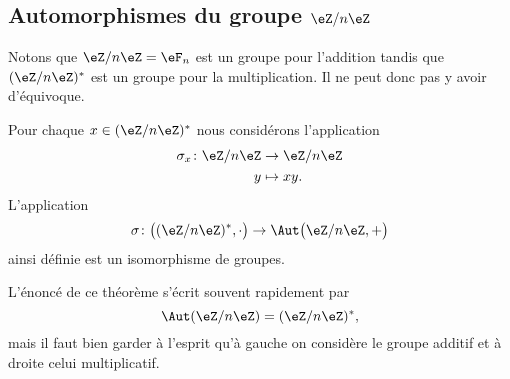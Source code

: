 \subsection{Automorphismes du groupe \texorpdfstring{$ \eZ/n\eZ$}{Z/nZ}}

Notons que \( \eZ/n\eZ=\eF_n\) est un groupe pour l'addition tandis que \( (\eZ/n\eZ)^*\) est un groupe pour la multiplication. Il ne peut donc pas y avoir d'équivoque.

\begin{theorem}   \label{ThoozyeSn}
    Pour chaque \( x\in (\eZ/n\eZ)^*\) nous considérons l'application
    \begin{equation}
        \begin{aligned}
            \sigma_x\colon \eZ/n\eZ&\to \eZ/n\eZ \\
            y&\mapsto xy. 
        \end{aligned}
    \end{equation}
    L'application
    \begin{equation}
        \sigma\colon \big( (\eZ/n\eZ)^*,\cdot\big)\to \Aut\big( \eZ/n\eZ,+ \big)
    \end{equation}
    ainsi définie est un isomorphisme de groupes.
\end{theorem}
L'énoncé de ce théorème s'écrit souvent rapidement par 
\begin{equation}
    \Aut(\eZ/n\eZ)=(\eZ/n\eZ)^*,
\end{equation}
mais il faut bien garder à l'esprit qu'à gauche on considère le groupe additif et à droite celui multiplicatif.

